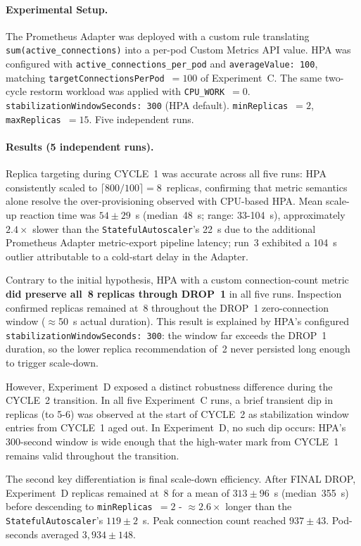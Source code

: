 \documentclass[3p,twocolumn]{elsarticle}
\theoremstyle{plain}%
\theoremstyle{definition}%
\begin{document}
\paragraph{Experimental Setup.} The Prometheus Adapter was deployed with a custom rule
translating \texttt{sum(active\_connections)} into a per-pod Custom Metrics API value. HPA
was configured with \texttt{active\_connections\_per\_pod} and \texttt{averageValue: 100},
matching \texttt{targetConnectionsPerPod}~$= 100$ of Experiment~C. The same two-cycle
restorm workload was applied with \texttt{CPU\_WORK}~$= 0$.
\texttt{stabilizationWindowSeconds: 300} (HPA default). \texttt{minReplicas}~$= 2$,
\texttt{maxReplicas}~$= 15$. Five independent runs.

\paragraph{Results (5 independent runs).} Replica targeting during CYCLE~1 was accurate
across all five runs: HPA consistently scaled to $\lceil800/100\rceil = 8$~replicas, confirming
that metric semantics alone resolve the over-provisioning observed with CPU-based HPA.
Mean scale-up reaction time was $54 \pm 29$~s (median~48~s; range: 33-104~s),
approximately $2.4\times$ slower than the \texttt{StatefulAutoscaler}'s 22~s due to the
additional Prometheus Adapter metric-export pipeline latency; run~3 exhibited a 104~s
outlier attributable to a cold-start delay in the Adapter.

Contrary to the initial hypothesis, HPA with a custom connection-count metric \textbf{did
preserve all~8 replicas through DROP~1} in all five runs. Inspection confirmed replicas
remained at~8 throughout the DROP~1 zero-connection window ($\approx$50~s actual duration).
This result is explained by HPA's configured \texttt{stabilizationWindowSeconds: 300}: the
window far exceeds the DROP~1 duration, so the lower replica recommendation of~2 never
persisted long enough to trigger scale-down.

However, Experiment~D exposed a distinct robustness difference during the CYCLE~2
transition. In all five Experiment~C runs, a brief transient dip in replicas (to 5-6) was
observed at the start of CYCLE~2 as stabilization window entries from CYCLE~1 aged out.
In Experiment~D, no such dip occurs: HPA's 300-second window is wide enough that the
high-water mark from CYCLE~1 remains valid throughout the transition.

The second key differentiation is final scale-down efficiency. After FINAL DROP, Experiment~D
replicas remained at~8 for a mean of $313 \pm 96$~s (median~355~s) before descending to
\texttt{minReplicas}~$= 2$ - $\approx 2.6\times$ longer than the \texttt{StatefulAutoscaler}'s
$119 \pm 2$~s. Peak connection count reached $937 \pm 43$. Pod-seconds averaged
$3{,}934 \pm 148$.
\end{document}
